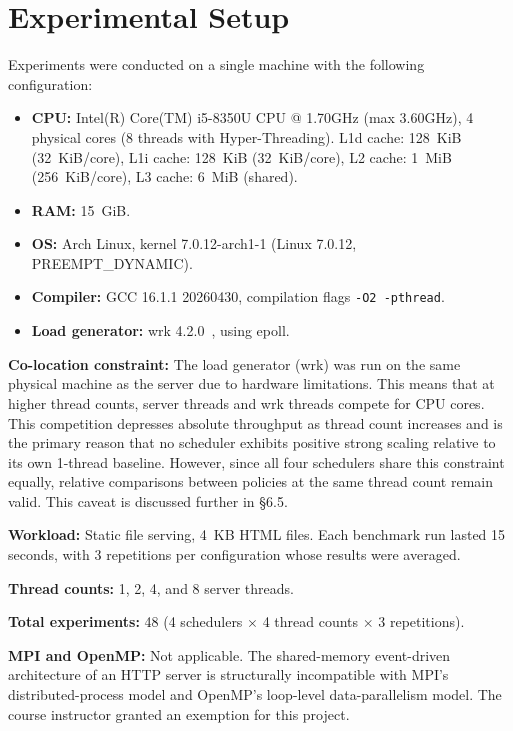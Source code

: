 \documentclass[conference]{IEEEtran}
\begin{document}
\section{Experimental Setup}

Experiments were conducted on a single machine with the following configuration:

\begin{itemize}
    \item \textbf{CPU:} Intel(R) Core(TM) i5-8350U CPU @ 1.70{}GHz (max 3.60{}GHz), 4 physical cores (8 threads with Hyper-Threading). L1d cache: 128~KiB (32~KiB/core), L1i cache: 128~KiB (32~KiB/core), L2 cache: 1~MiB (256~KiB/core), L3 cache: 6~MiB (shared).
    \item \textbf{RAM:} 15~GiB.
    \item \textbf{OS:} Arch Linux, kernel 7.0.12-arch1-1 (Linux 7.0.12, PREEMPT\_DYNAMIC).
    \item \textbf{Compiler:} GCC 16.1.1 20260430, compilation flags \texttt{-O2 -pthread}.
    \item \textbf{Load generator:} wrk 4.2.0~\cite{b12}, using epoll.
\end{itemize}

\textbf{Co-location constraint:} The load generator (wrk) was run on the same physical machine as the server due to hardware limitations. This means that at higher thread counts, server threads and wrk threads compete for CPU cores. This competition depresses absolute throughput as thread count increases and is the primary reason that no scheduler exhibits positive strong scaling relative to its own 1-thread baseline. However, since all four schedulers share this constraint equally, relative comparisons between policies at the same thread count remain valid. This caveat is discussed further in \S6.5.

\textbf{Workload:} Static file serving, 4~KB HTML files. Each benchmark run lasted 15 seconds, with 3 repetitions per configuration whose results were averaged.

\textbf{Thread counts:} 1, 2, 4, and 8 server threads.

\textbf{Total experiments:} 48 (4 schedulers $\times$ 4 thread counts $\times$ 3 repetitions).

\textbf{MPI and OpenMP:} Not applicable. The shared-memory event-driven architecture of an HTTP server is structurally incompatible with MPI's distributed-process model and OpenMP's loop-level data-parallelism model. The course instructor granted an exemption for this project.
\end{document}
